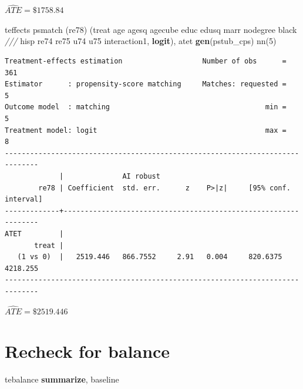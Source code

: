 \documentclass[
]{book}
\newenvironment{Shaded}{\begin{snugshade}}{\end{snugshade}}
\newcommand{\BaseNTok}[1]{\textcolor[rgb]{0.00,0.00,0.81}{#1}}
\newcommand{\CommentTok}[1]{\textcolor[rgb]{0.56,0.35,0.01}{\textit{#1}}}
\newcommand{\KeywordTok}[1]{\textcolor[rgb]{0.13,0.29,0.53}{\textbf{#1}}}
\newcommand{\NormalTok}[1]{#1}
\begin{document}
\(\widehat{ATE}= \$1758.84\)

\begin{Shaded}
\begin{Highlighting}[]
\NormalTok{teffects psmatch (re78) (treat age agesq agecube educ edusq marr nodegree }\BaseNTok{black} \CommentTok{///}
\NormalTok{ hisp re74 re75 u74 u75 interaction1, }\KeywordTok{logit}\NormalTok{), atet }\KeywordTok{gen}\NormalTok{(pstub\_cps) nn(5)}
\end{Highlighting}
\end{Shaded}

\begin{verbatim}
Treatment-effects estimation                   Number of obs      =        361
Estimator      : propensity-score matching     Matches: requested =          5
Outcome model  : matching                                     min =          5
Treatment model: logit                                        max =          8
------------------------------------------------------------------------------
             |              AI robust
        re78 | Coefficient  std. err.      z    P>|z|     [95% conf. interval]
-------------+----------------------------------------------------------------
ATET         |
       treat |
   (1 vs 0)  |   2519.446   866.7552     2.91   0.004     820.6375    4218.255
------------------------------------------------------------------------------
\end{verbatim}

\(\widehat{ATE}= \$2519.446\)

\section{Recheck for balance}\label{recheck-for-balance}

\begin{Shaded}
\begin{Highlighting}[]
\NormalTok{tebalance }\KeywordTok{summarize}\NormalTok{, baseline}
\end{Highlighting}
\end{Shaded}
\end{document}
